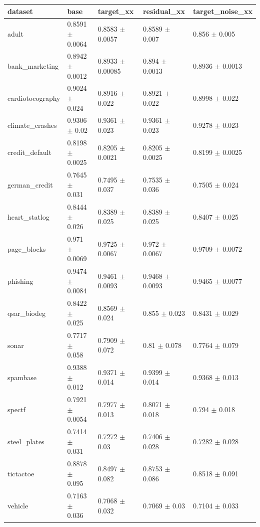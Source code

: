 \begin{tabular}{lllll}
\toprule
dataset & base & target\_xx & residual\_xx & target\_noise\_xx \\
\midrule
adult & 0.8591 $\pm$ 0.0064 & 0.8583 $\pm$ 0.0057 & 0.8589 $\pm$ 0.007 & 0.856 $\pm$ 0.005 \\
bank\_marketing & 0.8942 $\pm$ 0.0012 & 0.8933 $\pm$ 0.00085 & 0.894 $\pm$ 0.0013 & 0.8936 $\pm$ 0.0013 \\
cardiotocography & 0.9024 $\pm$ 0.024 & 0.8916 $\pm$ 0.022 & 0.8921 $\pm$ 0.022 & 0.8998 $\pm$ 0.022 \\
climate\_crashes & 0.9306 $\pm$ 0.02 & 0.9361 $\pm$ 0.023 & 0.9361 $\pm$ 0.023 & 0.9278 $\pm$ 0.023 \\
credit\_default & 0.8198 $\pm$ 0.0025 & 0.8205 $\pm$ 0.0021 & 0.8205 $\pm$ 0.0025 & 0.8199 $\pm$ 0.0025 \\
german\_credit & 0.7645 $\pm$ 0.031 & 0.7495 $\pm$ 0.037 & 0.7535 $\pm$ 0.036 & 0.7505 $\pm$ 0.024 \\
heart\_statlog & 0.8444 $\pm$ 0.026 & 0.8389 $\pm$ 0.025 & 0.8389 $\pm$ 0.025 & 0.8407 $\pm$ 0.025 \\
page\_blocks & 0.971 $\pm$ 0.0069 & 0.9725 $\pm$ 0.0067 & 0.972 $\pm$ 0.0067 & 0.9709 $\pm$ 0.0072 \\
phishing & 0.9474 $\pm$ 0.0084 & 0.9461 $\pm$ 0.0093 & 0.9468 $\pm$ 0.0093 & 0.9465 $\pm$ 0.0077 \\
qsar\_biodeg & 0.8422 $\pm$ 0.025 & 0.8569 $\pm$ 0.024 & 0.855 $\pm$ 0.023 & 0.8431 $\pm$ 0.029 \\
sonar & 0.7717 $\pm$ 0.058 & 0.7909 $\pm$ 0.072 & 0.81 $\pm$ 0.078 & 0.7764 $\pm$ 0.079 \\
spambase & 0.9388 $\pm$ 0.012 & 0.9371 $\pm$ 0.014 & 0.9399 $\pm$ 0.014 & 0.9368 $\pm$ 0.013 \\
spectf & 0.7921 $\pm$ 0.0054 & 0.7977 $\pm$ 0.013 & 0.8071 $\pm$ 0.018 & 0.794 $\pm$ 0.018 \\
steel\_plates & 0.7414 $\pm$ 0.031 & 0.7272 $\pm$ 0.03 & 0.7406 $\pm$ 0.028 & 0.7282 $\pm$ 0.028 \\
tictactoe & 0.8878 $\pm$ 0.095 & 0.8497 $\pm$ 0.082 & 0.8753 $\pm$ 0.086 & 0.8518 $\pm$ 0.091 \\
vehicle & 0.7163 $\pm$ 0.036 & 0.7068 $\pm$ 0.032 & 0.7069 $\pm$ 0.03 & 0.7104 $\pm$ 0.033 \\
\bottomrule
\end{tabular}
